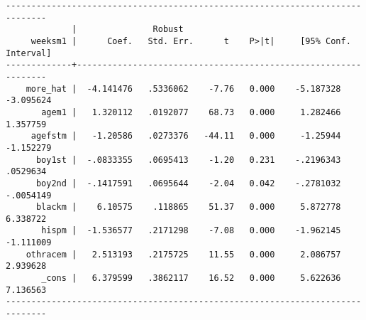 \documentclass[cache=false]{article}
\begin{document}
\begin{verbatim}
------------------------------------------------------------------------------
             |               Robust
     weeksm1 |      Coef.   Std. Err.      t    P>|t|     [95% Conf. Interval]
-------------+----------------------------------------------------------------
    more_hat |  -4.141476   .5336062    -7.76   0.000    -5.187328   -3.095624
       agem1 |   1.320112   .0192077    68.73   0.000     1.282466    1.357759
     agefstm |   -1.20586   .0273376   -44.11   0.000     -1.25944   -1.152279
      boy1st |  -.0833355   .0695413    -1.20   0.231    -.2196343    .0529634
      boy2nd |  -.1417591   .0695644    -2.04   0.042    -.2781032   -.0054149
      blackm |    6.10575    .118865    51.37   0.000     5.872778    6.338722
       hispm |  -1.536577   .2171298    -7.08   0.000    -1.962145   -1.111009
    othracem |   2.513193   .2175725    11.55   0.000     2.086757    2.939628
       _cons |   6.379599   .3862117    16.52   0.000     5.622636    7.136563
------------------------------------------------------------------------------
\end{verbatim}
\end{document}
